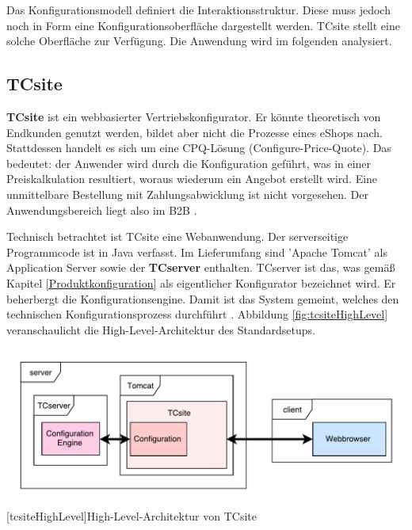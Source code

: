 \documentclass[11pt, a4paper, titlepage, listof=totoc, bibliography=totoc, index=totoc, twoside, openright, headings=normal]{scrreprt}
\begin{document}
Das Konfigurationsmodell definiert die Interaktionsstruktur. Diese muss jedoch noch in Form eine Konfigurationsoberfläche dargestellt werden. TCsite stellt eine solche Oberfläche zur Verfügung. Die Anwendung wird im folgenden analysiert.

\subsection{TCsite}
\label{subsection:TCsite}
\textbf{TCsite} ist ein webbasierter Vertriebskonfigurator. Er könnte theoretisch von Endkunden genutzt werden, bildet aber nicht die Prozesse eines eShops nach. Stattdessen handelt es sich um eine CPQ-Lösung (Configure-Price-Quote). Das bedeutet: der Anwender wird durch die Konfiguration geführt, was in einer Preiskalkulation resultiert, woraus wiederum ein Angebot erstellt wird. Eine unmittelbare Bestellung mit Zahlungsabwicklung ist nicht vorgesehen. Der Anwendungsbereich liegt also im B2B \citep{tactonAbout}.

Technisch betrachtet ist TCsite eine Webanwendung. Der serverseitige Programmcode ist in Java verfasst. Im Lieferumfang sind 'Apache Tomcat' als Application Server sowie der \textbf{TCserver} enthalten. TCserver ist das, was gemäß Kapitel \ref{Produktkonfiguration} als eigentlicher Konfigurator bezeichnet wird. Er beherbergt die Konfigurationsengine. Damit ist das System gemeint, welches den technischen Konfigurationsprozess durchführt \citep{tactonTCsiteHandbook}. Abbildung \ref{fig:tcsiteHighLevel} veranschaulicht die High-Level-Architektur des Standardsetups.

\vspace{1em}
\begin{minipage}{\linewidth}
	\centering
	\includegraphics[width=1\linewidth]{Abbildungen/tcsiteHighLevel.pdf}
	[tcsiteHighLevel]{High-Level-Architektur von TCsite}
	\label{fig:tcsiteHighLevel}
\end{minipage}
\vspace{1em}
\end{document}
